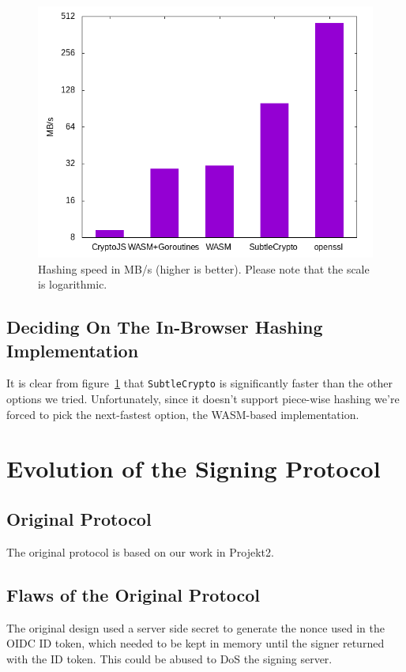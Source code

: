 \begin{figure}
    \begin{center}
        \includegraphics[width=0.7\linewidth]{images/hashingperformance.png}
        \caption{Hashing speed in MB/s (higher is better). Please note that the scale is logarithmic.}
        \label{fig:hashingperformance}
    \end{center}
\end{figure}


\subsection{Deciding On The In-Browser Hashing Implementation}
\label{subsec:deciding-on-the-in-browser-hashing-implementation}
It is clear from figure~\ref{fig:hashingperformance} that \texttt{SubtleCrypto} is significantly faster than the other options we tried.
Unfortunately, since it doesn't support piece-wise hashing we're forced to pick the next-fastest option, the \gls{WASM}-based implementation.

\section{Evolution of the Signing Protocol}
\label{sec:signingprotocol}

\subsection{Original Protocol}
The original protocol is based on our work in Projekt2.

\subsection{Flaws of the Original Protocol}
The original design used a server side secret to generate the nonce used in the \gls{OIDC} ID token, which needed to be kept in memory until the signer returned with the ID token. This could be abused to \gls{DoS} the signing server.

